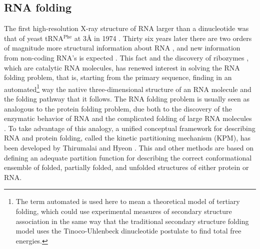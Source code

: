\subsection{RNA folding}
The first  high-resolution X-ray structure  of RNA larger
than a dinucleotide was  that of yeast tRNA$^{\textrm{Phe}}$ at 3{\AA}
in  1974 \cite{robertus1974,  kim1974, stout1976}.   Thirty  six years
later there  are two orders  of magnitude more  structural information
about RNA \cite{noller2005}, and new information from non-coding RNA's
is  expected  \cite{weinberg2009}.  This  fact  and  the discovery  of
ribozymes  \cite{kruger1982,  takada1983},  which  are  catalytic  RNA
molecules, has  renewed interest in solving  the RNA folding  problem,  that is,  starting  from  the primary  sequence,
finding in  an automated\footnote{The term  automated is used  here to
  mean  a  theoretical model  of  tertiary  folding,  which could  use
  experimental measures of secondary structure association in the same
  way   that  the  traditional   secondary  structure   folding  model
  \cite{zuker1989,    hofacker1994}    uses    the    Tinoco-Uhlenbeck
  dinucleotide   postulate  \cite{borer1974}   to   find  total   free
  energies.}   way the  native three-dimensional  structure of  an RNA
molecule  and   the  folding  pathway   that  it  follows.    The  RNA
folding problem is usually seen as analogous to the
protein folding  problem, due both  to the discovery of  the enzymatic
behavior  of  RNA \cite{kruger1982,  takada1983}  and the  complicated
folding of large RNA molecules \cite{batey1999}.  To take advantage of
this analogy,  a unified conceptual  framework for describing  RNA and
protein folding, called the  kinetic partitioning mechanism (KPM), has
been developed by Thirumalai and Hyeon \cite{thirumalai2005}. This and
other methods are based on defining an adequate partition function for
describing  the correct conformational  ensemble of  folded, partially
folded,    and   unfolded    structures    \cite{chen1995,   chen1998,
  thirumalai1996} of either protein or RNA.

